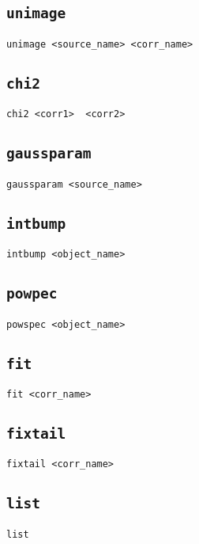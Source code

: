 \subsection{{\tt unimage}}
\begin{verbatim}
unimage <source_name> <corr_name>
\end{verbatim}

\subsection{{\tt chi2}}
\begin{verbatim}
chi2 <corr1>  <corr2> 
\end{verbatim}

\subsection{{\tt gaussparam}}
\begin{verbatim}
gaussparam <source_name> 
\end{verbatim}

\subsection{{\tt intbump}}
\begin{verbatim}
intbump <object_name>
\end{verbatim}

\subsection{{\tt powpec}}
\begin{verbatim}
powspec <object_name> 
\end{verbatim}

\subsection{{\tt fit}}
\begin{verbatim}
fit <corr_name>
\end{verbatim}

\subsection{{\tt fixtail}}
\begin{verbatim}
fixtail <corr_name> 
\end{verbatim}

\subsection{{\tt list}}
\begin{verbatim}
list
\end{verbatim}

